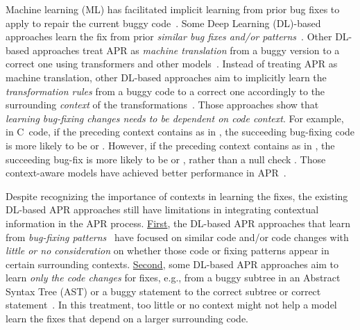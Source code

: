 Machine learning (ML)
has facilitated implicit learning from prior bug fixes to apply to repair
the current buggy
code~\cite{long2016automatic,long2017automatic,saha2017elixir}.
Some Deep Learning (DL)-based approaches learn the fix from prior {\em
  similar bug fixes and/or
  patterns}~\cite{gupta2017deepfix,white2019sorting,white2016deep}.
Other DL-based approaches treat APR as {\em machine translation} from
a buggy version to a correct one using transformers and other
models~\cite{chakrabortycodit,chen2018sequencer,hata2018learning,tufano2018empirical,see2017get}. Instead
of treating APR as machine translation, other DL-based approaches aim
to implicitly learn the {\em transformation rules} from a buggy code
to a correct one accordingly to the surrounding {\em context} of the
transformations~\cite{chen2018sequencer,icse20,cure-icse21,lutellier2020coconut}.
Those approaches show that {\em learning bug-fixing changes needs to
  be dependent on {\em code context}}. For example, in
C~code, if the preceding context contains  as in
, the succeeding
bug-fixing code is more likely to be  or
. However, if the preceding context contains
 as in , the
succeeding bug-fix is more likely to be  or
, rather than a null check .
Those context-aware models have achieved better performance in
APR~\cite{icse20,lutellier2020coconut,cure-icse21}.


Despite recognizing the importance of contexts in learning the fixes,
the existing DL-based APR approaches still have limitations in
integrating contextual information in the APR
process. \underline{First}, the DL-based APR approaches that learn
from {\em bug-fixing patterns}~\cite{white2016deep,gupta2017deepfix}
have focused on similar code and/or code changes with {\em little or
  no consideration} on whether those code or fixing patterns appear in
certain surrounding contexts. \underline{Second}, some DL-based APR
approaches aim to learn {\em only the code changes} for fixes, e.g.,
from a buggy subtree in an Abstract Syntax Tree (AST) or a buggy
statement to the correct subtree or correct
statement~\cite{chakrabortycodit,see2017get}. In this treatment, too
little or no context might not help a model learn the fixes that depend on a
larger surrounding code.

